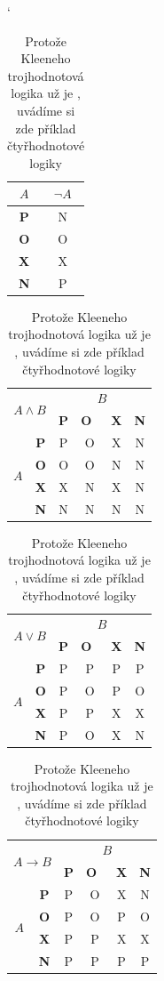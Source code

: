 \documentclass[a4paper, 11pt]{article}
\begin{document}
\begin{table}[h]
	\catcode`
	\begin{center}
		\begin{tabular}{|c|c|}
			\hline $A$ & $\neg A$ \\ \hline
			\bfseries P & N \\ \hline
			\bfseries O & O \\ \hline
			\bfseries X & X \\ \hline
			\bfseries N & P \\ \hline
		\end{tabular}
		\begin{tabular}{|c|c|c|c|c|c|}
			\hline \multicolumn{2}{|c|}{\multirow{2}{*}{$A \wedge B$}} & \multicolumn{4}{c|}{$B$} \\
			\cline{3-6}
			\multicolumn{2}{|c|}{} & \bfseries P & \bfseries O~& \bfseries X & \bfseries N \\ \hline
			\multirow{4}{*}{$A$} 
			& \bfseries P & P & O & X & N \\ \cline{2-6}
			& \bfseries O & O & O & N & N \\ \cline{2-6}
			& \bfseries X & X & N & X & N \\ \cline{2-6}
			& \bfseries N & N & N & N & N \\ \hline
		\end{tabular}
		\begin{tabular}{|c|c|c|c|c|c|}
			\hline \multicolumn{2}{|c|}{\multirow{2}{*}{$A \vee B$}} & \multicolumn{4}{c|}{$B$} \\
			\cline{3-6}
			\multicolumn{2}{|c|}{} & \bfseries P & \bfseries O~& \bfseries X & \bfseries N \\ \hline
			\multirow{4}{*}{$A$} 
			& \bfseries P & P & P & P & P \\ \cline{2-6}
			& \bfseries O & P & O & P & O \\ \cline{2-6}
			& \bfseries X & P & P & X & X \\ \cline{2-6}
			& \bfseries N & P & O & X & N \\ \hline
		\end{tabular}
		\begin{tabular}{|c|c|c|c|c|c|}
			\hline \multicolumn{2}{|c|}{\multirow{2}{*}{$A \rightarrow B$}} & \multicolumn{4}{c|}{$B$} \\
			\cline{3-6}
			\multicolumn{2}{|c|}{} & \bfseries P & \bfseries O~& \bfseries X & \bfseries N \\ \hline
			\multirow{4}{*}{$A$} 
			& \bfseries P & P & O & X & N \\ \cline{2-6}
			& \bfseries O & P & O & P & O \\ \cline{2-6}
			& \bfseries X & P & P & X & X \\ \cline{2-6}
			& \bfseries N & P & P & P & P \\ \hline
		\end{tabular}
	\end{center}
	\caption{Protože Kleeneho trojhodnotová logika už je , uvádíme si zde příklad čtyřhodnotové logiky}
	\label{tabulka2}
\end{table}
\end{document}
